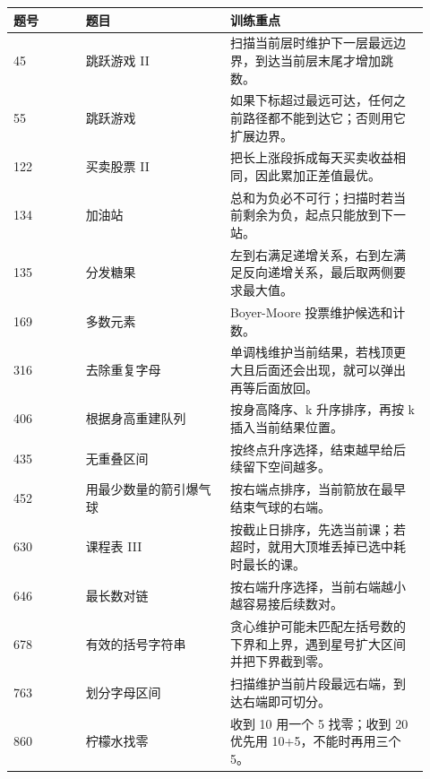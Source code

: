 
\begin{longtable}{@{}p{0.16\linewidth}p{0.32\linewidth}p{0.44\linewidth}@{}}
\toprule
题号 & 题目 & 训练重点\\
\midrule
\endhead
45 & 跳跃游戏 II & 扫描当前层时维护下一层最远边界，到达当前层末尾才增加跳数。\\
55 & 跳跃游戏 & 如果下标超过最远可达，任何之前路径都不能到达它；否则用它扩展边界。\\
122 & 买卖股票 II & 把长上涨段拆成每天买卖收益相同，因此累加正差值最优。\\
134 & 加油站 & 总和为负必不可行；扫描时若当前剩余为负，起点只能放到下一站。\\
135 & 分发糖果 & 左到右满足递增关系，右到左满足反向递增关系，最后取两侧要求最大值。\\
169 & 多数元素 & Boyer-Moore 投票维护候选和计数。\\
316 & 去除重复字母 & 单调栈维护当前结果，若栈顶更大且后面还会出现，就可以弹出再等后面放回。\\
406 & 根据身高重建队列 & 按身高降序、k 升序排序，再按 k 插入当前结果位置。\\
435 & 无重叠区间 & 按终点升序选择，结束越早给后续留下空间越多。\\
452 & 用最少数量的箭引爆气球 & 按右端点排序，当前箭放在最早结束气球的右端。\\
630 & 课程表 III & 按截止日排序，先选当前课；若超时，就用大顶堆丢掉已选中耗时最长的课。\\
646 & 最长数对链 & 按右端升序选择，当前右端越小越容易接后续数对。\\
678 & 有效的括号字符串 & 贪心维护可能未匹配左括号数的下界和上界，遇到星号扩大区间并把下界截到零。\\
763 & 划分字母区间 & 扫描维护当前片段最远右端，到达右端即可切分。\\
860 & 柠檬水找零 & 收到 10 用一个 5 找零；收到 20 优先用 10+5，不能时再用三个 5。\\
\bottomrule
\end{longtable}


